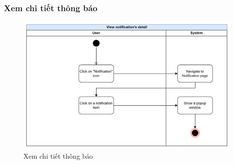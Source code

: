 \subsubsection{Xem chi tiết thông báo}
    \begin{figure}[H]
        \centering
        \includegraphics[width=\linewidth]{Content/Phân tích và thiết kế hệ thống/documents/Sơ đồ hoạt động/images/viewNotificationDetail.png}
        \vspace{0.5cm}
        \caption{Xem chi tiết thông báo}
        \label{fig:Xem chi tiết thông báo}
    \end{figure}